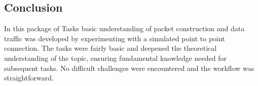 \subsection{Conclusion}
In this package of Tasks basic understanding of packet construction and data traffic was developed by experimenting with a simulated point to point connection. The tasks were fairly basic and deepened the theoretical understanding of the topic, ensuring fundamental knowledge needed for subsequent tasks. No difficult challenges were encountered and the workflow was straightforward.


